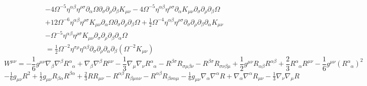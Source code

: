\documentclass[10pt,letterpaper]{article}
\begin{document}
\begin{align}
 &- 4\Omega^{-5} \eta^{\alpha \beta} \eta^{\rho \sigma} \partial_{\alpha}\Omega \partial_{\sigma}\partial_{\rho}\partial_{\beta}K_{\mu \nu}- 4 \Omega^{-5}\eta^{\alpha \beta} \eta^{\rho \sigma} \partial_{\alpha}K_{\mu \nu} \partial_{\sigma}\partial_{\rho}\partial_{\beta}\Omega\nonumber \\
 & + 12\Omega^{-6} \eta^{\alpha \beta} \eta^{\rho \sigma} K_{\mu \nu} \partial_{\alpha}\Omega \partial_{\sigma}\partial_{\rho}\partial_{\beta}\Omega + \tfrac{1}{2}\Omega^{-4} \eta^{\alpha \beta} \eta^{\rho \sigma} \partial_{\sigma}\partial_{\rho}\partial_{\beta}\partial_{\alpha}K_{\mu \nu}\nonumber \\
 &-  \Omega^{-5}\eta^{\alpha \beta} \eta^{\rho \sigma} K_{\mu \nu} \partial_{\sigma}\partial_{\rho}\partial_{\beta}\partial_{\alpha}\Omega \nonumber \\
&= \frac12 \Omega^{-2} \eta^{\sigma\rho}\eta^{\alpha\beta}\partial_\sigma\partial_\rho\partial_\alpha \partial_\beta (\Omega^{-2}K_{\mu\nu}) 
\end{align}
$$W^{\mu \nu}=
-\frac{1}{6}g^{\mu\nu}\nabla_{\beta}\nabla^{\beta}R^{\alpha}_{\phantom{\alpha}\alpha}
+\nabla_{\beta}\nabla^{\beta}R^{\mu\nu}                    
 -\frac{1}{3}\nabla_{\mu}\nabla_{\nu}R^{\alpha}_{\phantom{\alpha}\alpha}  
 -R^{\beta\sigma} R_{\sigma\mu\beta\nu}   
  -R^{\beta\sigma} R_{\sigma\nu\beta\mu}  
+\frac{1}{2}g^{\mu\nu}R_{\alpha\beta}R^{\alpha\beta}                                            
+\frac{2}{3}R^{\alpha}_{\phantom{\alpha}\alpha}R^{\mu\nu}                              
-\frac{1}{6}g^{\mu\nu}(R^{\alpha}_{\phantom{\alpha}\alpha})^2$$
\begin{equation}
- \tfrac{1}{6} g_{\mu \nu} R^2 + \tfrac{1}{2} g_{\mu \nu} R_{\beta \alpha} R^{\beta \alpha} + \tfrac{2}{3} R R_{\mu \nu} -  R^{\alpha \beta} R_{\beta \mu \alpha \nu} -  R^{\alpha \beta} R_{\beta \nu \alpha \mu} -  \tfrac{1}{6} g_{\mu \nu} \nabla_{\alpha}\nabla^{\alpha}R + \nabla_{\alpha}\nabla^{\alpha}R_{\mu \nu} -  \tfrac{1}{3} \nabla_{\nu}\nabla_{\mu}R
\end{equation}
\end{document}
